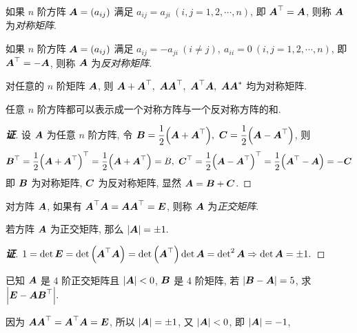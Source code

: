 \begin{definition}[对称矩阵]
    如果 $ n $ 阶方阵 $ \vb*{A}=\left(a_{i j}\right) $ 满足 $ a_{i j}=a_{j i}~ (i, j=1,2, \cdots, n) $, 即 $ \vb*{A}^{\top}=\vb*{A} $, 则称 $ \vb*{A} $ 为\textit{对称矩阵}.
\end{definition}
\begin{definition}[反对称矩阵]
    如果 $ n $ 阶方阵 $ \vb*{A}=\left(a_{i j}\right) $ 满足 $ a_{i j}=-a_{j i}~ (i \neq j),~a_{i i}=0~ (i, j=1,2, \cdots ,  n) $,
    即 $ \vb*{A}^{\top}=-\vb*{A} $, 则称 $ \vb*{A} $ 为\textit{反对称矩阵}.
\end{definition}
\begin{theorem}
    对任意的 $n$ 阶矩阵 $\vb*{A}$, 则 $\vb*{A}+\vb*{A}^\top,~\vb*{AA}^\top,~\vb*{A}^\top\vb*{A},~\vb*{AA}^*$ 均为对称矩阵.
\end{theorem}
\begin{theorem}[方阵的对称表达]
    任意 $n$ 阶方阵都可以表示成一个对称方阵与一个反对称方阵的和.
\end{theorem}
\begin{proof}[{\songti \textbf{证}}]
    设 $\vb*{A}$ 为任意 $n$ 阶方阵, 令 $\vb*{B}=\dfrac{1}{2}\qty(\vb*{A}+\vb*{A}^{\top}),~\vb*{C}=\dfrac{1}{2}\qty(\vb*{A}-\vb*{A}^{\top})$, 则
    $$\vb*{B}^\top=\dfrac{1}{2}\qty(\vb*{A}+\vb*{A}^{\top})^\top=\dfrac{1}{2}\qty(\vb*{A}+\vb*{A}^{\top})=B,~
        \vb*{C}^\top=\dfrac{1}{2}\qty(\vb*{A}-\vb*{A}^{\top})^\top=\dfrac{1}{2}\qty(\vb*{A}^\top-\vb*{A})=-\vb*{C}$$
    即 $\vb*{B}$ 为对称矩阵, $\vb*{C}$ 为反对称矩阵, 显然 $\vb*{A}=\vb*{B}+\vb*{C}$.
\end{proof}

\begin{definition}[正交矩阵]
    对方阵 $ \vb*{A} $, 如果有 $ \vb*{A}^{\top} \vb*{A}=\vb*{A} \vb*{A}^{\top}=\vb*{E} $, 则称 $ \vb*{A} $ 为\textit{正交矩阵}.
\end{definition}
\begin{theorem}[正交矩阵的行列式]
    若方阵 $ \vb*{A} $ 为正交矩阵, 那么 $|\vb*{A}|=\pm 1.$
\end{theorem}
\begin{proof}[{\songti \textbf{证}}]
    $1=\det\vb*{E}=\det\qty(\vb*{A}^\top\vb*{A})=\det\qty(\vb*{A}^\top)\det\vb*{A}=\det^2\vb*{A}\Rightarrow \det\vb*{A}=\pm 1.$
\end{proof}

\begin{example}
    已知 $\vb*{A}$ 是 4 阶正交矩阵且 $|\vb*{A}|<0$, $\vb*{B}$ 是 4 阶矩阵, 若 $|\vb*{B}-\vb*{A}|=5$, 求 $\qty|\vb*{E}-\vb*{AB}^\top|.$
\end{example}
\begin{solution}
    因为 $\vb*{AA}^\top=\vb*{A}^\top\vb*{A}=\vb*{E}$, 所以 $|\vb*{A}|=\pm 1$, 又 $|\vb*{A}|<0$, 即 $|\vb*{A}|=-1$,
\end{solution}

